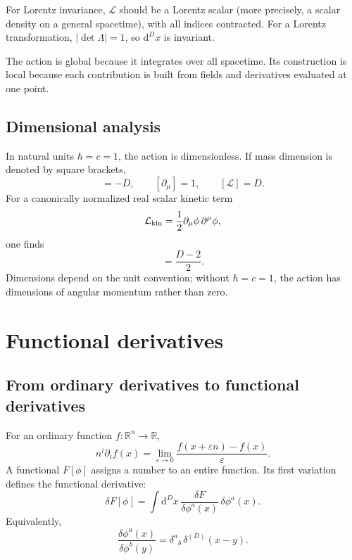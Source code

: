\documentclass[11pt]{article}
\newcommand{\dd}{\mathrm{d}}
\newcommand{\R}{\mathbb{R}}
\newcommand{\Lag}{\mathcal{L}}
\begin{document}
For Lorentz invariance, \(\Lag\) should be a Lorentz scalar (more precisely, a
scalar density on a general spacetime), with all indices contracted. For a
Lorentz transformation, \(|\det\Lambda|=1\), so \(\dd^D x\) is invariant.

\begin{keyidea}
The action is global because it integrates over all spacetime. Its
construction is local because each contribution is built from fields and
derivatives evaluated at one point.
\end{keyidea}

\subsection{Dimensional analysis}

In natural units \(\hbar=c=1\), the action is dimensionless. If mass dimension
is denoted by square brackets,
\begin{equation}
  [\dd^D x]=-D,
  \qquad
  [\partial_\mu]=1,
  \qquad
  [\Lag]=D.
  \label{eq:dimensions}
\end{equation}
For a canonically normalized real scalar kinetic term
\begin{equation}
  \Lag_{\rm kin}=\frac12\partial_\mu\phi\,\partial^\mu\phi,
\end{equation}
one finds
\begin{equation}
  [\phi]=\frac{D-2}{2}.
  \label{eq:scalardimension}
\end{equation}
Dimensions depend on the unit convention; without \(\hbar=c=1\), the action
has dimensions of angular momentum rather than zero.

\section{Functional derivatives}

\subsection{From ordinary derivatives to functional derivatives}

For an ordinary function \(f:\R^n\to\R\),
\begin{equation}
  n^i\partial_i f(x)
  =\lim_{\varepsilon\to0}
  \frac{f(x+\varepsilon n)-f(x)}{\varepsilon}.
\end{equation}
A functional \(F[\phi]\) assigns a number to an entire function. Its first
variation defines the functional derivative:
\begin{equation}
  \delta F[\phi]
  =\int \dd^D x\,
  \frac{\delta F}{\delta\phi^a(x)}\,
  \delta\phi^a(x).
  \label{eq:functionalDerivativeDefinition}
\end{equation}
Equivalently,
\begin{equation}
  \frac{\delta\phi^a(x)}{\delta\phi^b(y)}
  =\delta^a{}_b\,\delta^{(D)}(x-y).
  \label{eq:functionalDelta}
\end{equation}
\end{document}
